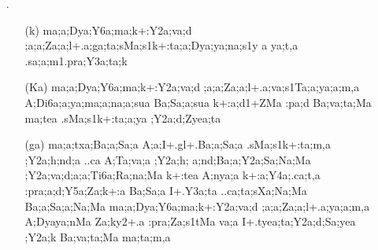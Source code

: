 \begin{spacing}{1.15}
\begin{itemize}
\begin{itemize}
      \item[({\sktf Ka}).] {\sktf Za;a;s1:t4i6a;a;ya;gr4a;nTa;a;Dya;ya;na;a;TR%
2a .sMa;pra;Y3a;ta ;Y2a;va:(;a;Y2a;va;d;a;a;l+.ya%
\ZF{-}.sMa;s1k+:ta;pa;a;F+.na\ZF{-}k+:mea ya;a
v.ya;va;s1Ta;a va;tRa;tea\ZF{,} .sa;a :pa;ya;Ra;p1a;a I+.Y3a;ta
Ba;va;ntaH ma;nya;ntea ;Y2a;k+:m,a ma;h;a;Y2a;va;d%
;a;a;l+.yea;Sua ;Y2a;va:(;a;Y2a;va;d%
;a;a;l+.yea;Sua ..ca I+.d1+Za;Ma gr4a;nTa;ana;a;m,a A;Dya;a;pa;nMa :pra;Ba;Y2a;va;SNua Ba;vea;t,a\ZF{,} I+.tyea;ta;d;TeRa
k+:a;d+Zi6a;a
;Y2a;va;Dea;ya;pa;d;vi6a;a Ba;va;Y5a;;d2H
.sUa;.cyea;ta}
               \end{itemize}

\item[{\sktf 13}.] \begin{itemize}
    \item[({\sktf k})] {\sktf ma;a;Dya;Y6a;ma;k+:Y2a;va;d%
;a;a;Za;a;l+.a;ga;ta;sMa;s1k+:ta;a;Dya;ya;na;s1y%
a ya;t,a .sa;a;m1.pra;Y3a;ta;k}

     \item[({\sktf Ka})] {\sktf ma;a;Dya;Y6a;ma;k+:Y2a;va;d%
;a;a;Za;a;l+.a;va;s1Ta;a;ya;a;m,a A;Di6a;a;ya;ma;a;na;a;sua
Ba;Sa;a;sua k+:a;d1+ZMa :pa;d Ba;va;ta;Ma ma;tea
.sMa;s1k+:ta;a;ya ;Y2a;d;Zyea;ta }
            
            \item[({\sktf ga})] {\sktf ma;a;txa;Ba;a;Sa;a\ZF{,}
A;a;I+.gl+.Ba;a;Sa;a\ZF{,} .sMa;s1k+:ta;m,a\ZF{,}
;Y2a;h;nd;a ..ca \ZF{(}A;Ta;va;a\ZF{,} ;Y2a;h;%
a;nd;Ba;a;Y2a;Sa;Na;Ma ;Y2a;va;d;a;a;Ti6a;Ra;na;Ma
k+:tea A;nya;a k+:a;Y4a;.ca;t,a
:pra;a;d;Y5a;Za;k+:a Ba;Sa;a\ZF{),} I+.Y3a;ta
..ca;ta;sXa;Na;Ma Ba;a;Sa;a;Na;Ma ma;a;Dya;Y6a;ma;k+:Y2a;va;d%
;a;a;Za;a;l+.a;ya;a;m,a {A;Dya}ya{;nMa} Za;ky2+.a :pra;Za;s1tMa va;a\ZF{,}
I+.tyea;ta;Y2a;d;Sa;yea ;Y2a;k Ba;va;ta;Ma ma;ta;m,a}
            

\end{itemize}
\end{itemize}
\end{spacing}
